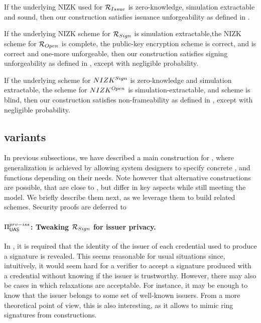 \begin{theorem}
  \label{thm:issue-forge-uas}
  If the underlying NIZK used for $\mathcal{R}_{Issue}$ is zero-knowledge,
  simulation extractable and sound, then our \CUASGen construction satisfies
  issuance unforgeability as defined in .
\end{theorem}

\begin{theorem}
  \label{thm:sign-forge-uas}
  If the underlying NIZK scheme for $\mathcal{R}_{Sign}$ is simulation
  extractable,the NIZK scheme for $\mathcal{R}_{Open}$ is complete, the public-key
  encryption scheme is correct, and \SBCM is correct and one-more unforgeable,
  then our \CUASGen construction satisfies signing unforgeability as defined in
  , except with negligible probability.
\end{theorem}

\begin{theorem}
  \label{thm:frame-uas}
  If the underlying scheme for $NIZK^{Sign}$ is zero-knowledge and simulation
  extractable, the scheme for $NIZK^{Open}$ is simulation-extractable, and
  \SBCM scheme is blind, then our \CUASGen construction satisfies
  non-frameability as defined in , except with negligible
  probability.
\end{theorem}

\subsection{\CUASGen variants}
\label{ssec:variants}

In previous subsections, we have described a main construction for \CUASGen,
where generalization is achieved by allowing system designers to specify
concrete \fissue, \feval and \finsp functions depending on their needs. Note
however that alternative constructions are possible, that are close to \CUASGen,
but differ in key aspects while still meeting the \UAS model. We briefly
describe them next, as we leverage them to build related schemes. Security
proofs are deferred to 

\paragraph{$\Pi_{\mathsf{UAS}}^{prv-iss}$: Tweaking $\mathcal{R}_{Sign}$ for issuer
  privacy.} %
In \CUASGen, it is required that the identity of the issuer of each credential
used to produce a signature is revealed. This seems reasonable for usual
situations since, intuitively, it would seem hard for a verifier to accept a
signature produced with a credential without knowing if the issuer is
trustworthy. However, there may also be cases in which relaxations are
acceptable. For instance, it may be enough to know that the issuer belongs to
some set of well-known issuers. From a more theoretical point of view, this is
also interesting, as it allows to mimic ring signatures from \UAS constructions.

